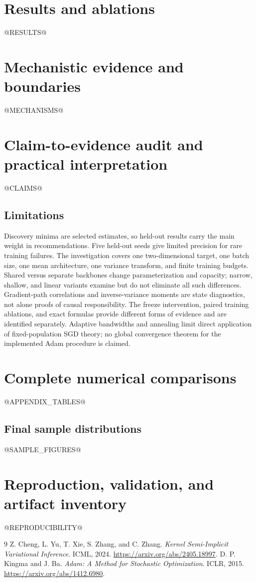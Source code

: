 \documentclass[11pt,a4paper]{article}
\begin{document}
\section{Results and ablations}
@RESULTS@

\section{Mechanistic evidence and boundaries}
@MECHANISMS@

\clearpage
\section{Claim-to-evidence audit and practical interpretation}
@CLAIMS@

\subsection{Limitations}
Discovery minima are selected estimates, so held-out results carry the main
weight in recommendations. Five held-out seeds give limited precision for
rare training failures. The investigation covers one two-dimensional target,
one batch size, one mean architecture, one variance transform, and finite
training budgets. Shared versus separate backbones change parameterization
and capacity; narrow, shallow, and linear variants examine but do not eliminate
all such differences. Gradient-path correlations and inverse-variance moments
are state diagnostics, not alone proofs of causal responsibility. The freeze
intervention, paired training ablations, and exact formulas provide different
forms of evidence and are identified separately. Adaptive bandwidths and
annealing limit direct application of fixed-population SGD theory; no global
convergence theorem for the implemented Adam procedure is claimed.

\appendix
\section{Complete numerical comparisons}
@APPENDIX_TABLES@

\clearpage
\begin{landscape}
\section{Final sample distributions}
@SAMPLE_FIGURES@
\end{landscape}

\section{Reproduction, validation, and artifact inventory}
@REPRODUCIBILITY@

\begin{thebibliography}{9}
 Z. Cheng, L. Yu, T. Xie, S. Zhang, and C. Zhang.
\emph{Kernel Semi-Implicit Variational Inference}. ICML, 2024.
\url{https://arxiv.org/abs/2405.18997}.
 D. P. Kingma and J. Ba.
\emph{Adam: A Method for Stochastic Optimization}. ICLR, 2015.
\url{https://arxiv.org/abs/1412.6980}.
\end{thebibliography}
\end{document}
